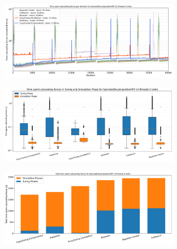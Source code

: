 \begin{figure}[h]
    \centering

    \begin{subfigure}[c]{\textwidth}
        \includegraphics[width=\columnwidth,trim={0cm 0 0cm 0.9cm},clip]{figures/Benchmark/SpinodalDecompositionMPI/SpinodalDecompositionMPI_timings_SpinodalDecompositionMPI_14_0.png}
        \caption{}
        \label{fig:spinodalTimings_14thread}
    \end{subfigure}


    \begin{subfigure}[c]{\textwidth}
        \includegraphics[width=\columnwidth,trim={0cm 0 0cm 1cm},clip]{figures/Benchmark/SpinodalDecompositionMPI/SpinodalDecompositionMPI_timings_boxplot_SpinodalDecompositionMPI_14_0.png}
        \caption{}
        \label{fig:spinodalBoxplot_14thread}
    \end{subfigure}

    \begin{subfigure}[b]{\textwidth}
        \includegraphics[width=\columnwidth,trim={0cm 0 0cm 0.9cm},clip]{figures/Benchmark/SpinodalDecompositionMPI/SpinodalDecompositionMPI_timings_total_SpinodalDecompositionMPI_14_0.png}
        \caption{}
        \label{fig:spinodalTotalTime_14thread}
    \end{subfigure}



\end{figure}
